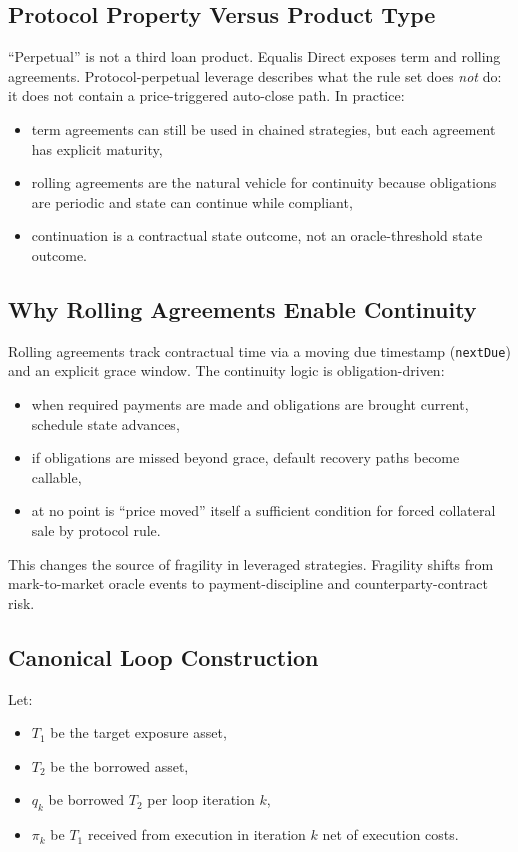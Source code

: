 \documentclass[version=preprint]{iacrcc}
\begin{document}
\subsection{Protocol Property Versus Product Type}

``Perpetual'' is not a third loan product. Equalis Direct exposes term and rolling agreements. Protocol-perpetual leverage describes what the rule set does \emph{not} do: it does not contain a price-triggered auto-close path. In practice:
\begin{itemize}
  \item term agreements can still be used in chained strategies, but each agreement has explicit maturity,
  \item rolling agreements are the natural vehicle for continuity because obligations are periodic and state can continue while compliant,
  \item continuation is a contractual state outcome, not an oracle-threshold state outcome.
\end{itemize}

\subsection{Why Rolling Agreements Enable Continuity}

Rolling agreements track contractual time via a moving due timestamp (\texttt{nextDue}) and an explicit grace window. The continuity logic is obligation-driven:
\begin{itemize}
  \item when required payments are made and obligations are brought current, schedule state advances,
  \item if obligations are missed beyond grace, default recovery paths become callable,
  \item at no point is ``price moved'' itself a sufficient condition for forced collateral sale by protocol rule.
\end{itemize}

This changes the source of fragility in leveraged strategies. Fragility shifts from mark-to-market oracle events to payment-discipline and counterparty-contract risk.

\subsection{Canonical Loop Construction}

Let:
\begin{itemize}
  \item $T_1$ be the target exposure asset,
  \item $T_2$ be the borrowed asset,
  \item $q_k$ be borrowed $T_2$ per loop iteration $k$,
  \item $\pi_k$ be $T_1$ received from execution in iteration $k$ net of execution costs.
\end{itemize}
\end{document}
